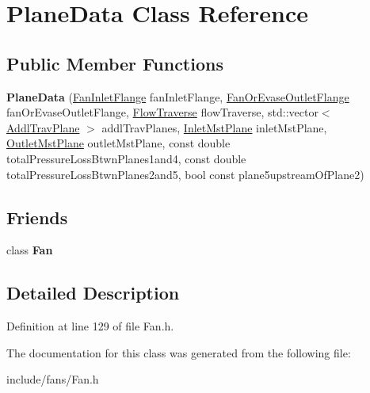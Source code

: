 \hypertarget{class_plane_data}{}\section{Plane\+Data Class Reference}
\label{class_plane_data}
\subsection*{Public Member Functions}
\begin{DoxyCompactItemize}
\item 
\mbox{\label{class_plane_data_a8369cd2584931ada313dc21ec79cb948}} 
{\bfseries Plane\+Data} (\hyperlink{class_fan_inlet_flange}{Fan\+Inlet\+Flange} fan\+Inlet\+Flange, \hyperlink{class_fan_or_evase_outlet_flange}{Fan\+Or\+Evase\+Outlet\+Flange} fan\+Or\+Evase\+Outlet\+Flange, \hyperlink{class_flow_traverse}{Flow\+Traverse} flow\+Traverse, std\+::vector$<$ \hyperlink{class_addl_trav_plane}{Addl\+Trav\+Plane} $>$ addl\+Trav\+Planes, \hyperlink{class_inlet_mst_plane}{Inlet\+Mst\+Plane} inlet\+Mst\+Plane, \hyperlink{class_outlet_mst_plane}{Outlet\+Mst\+Plane} outlet\+Mst\+Plane, const double total\+Pressure\+Loss\+Btwn\+Planes1and4, const double total\+Pressure\+Loss\+Btwn\+Planes2and5, bool const plane5upstream\+Of\+Plane2)
\end{DoxyCompactItemize}
\subsection*{Friends}
\begin{DoxyCompactItemize}
\item 
\mbox{\label{class_plane_data_a0a305abd4183ca4b5d3adb1b563378d7}} 
class {\bfseries Fan}
\end{DoxyCompactItemize}


\subsection{Detailed Description}


Definition at line 129 of file Fan.\+h.



The documentation for this class was generated from the following file\+:\begin{DoxyCompactItemize}
\item 
include/fans/Fan.\+h\end{DoxyCompactItemize}
